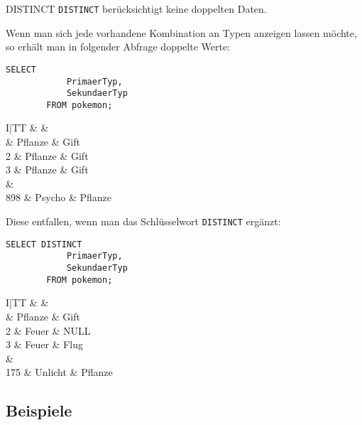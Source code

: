 \begin{sql}{DISTINCT}
    \texttt{DISTINCT} berücksichtigt keine doppelten Daten.

    Wenn man sich jede vorhandene Kombination an Typen anzeigen lassen möchte, so erhält man in folgender Abfrage doppelte Werte:

    \begin{lstlisting}[language=mysql]
        SELECT
            PrimaerTyp,
            SekundaerTyp
        FROM pokemon;
    \end{lstlisting}

    \setcounter{rownum}{0}
    \begin{tabular}{I|TT}
        &  &  \\ & Pflanze & Gift \\
        2 & Pflanze & Gift \\
        3 & Pflanze & Gift \\
         &  \\
        898 & Psycho & Pflanze \\
    \end{tabular}

    Diese entfallen, wenn man das Schlüsselwort \texttt{DISTINCT} ergänzt:

    \begin{lstlisting}[language=mysql]
        SELECT DISTINCT
            PrimaerTyp,
            SekundaerTyp
        FROM pokemon;
    \end{lstlisting}

    \setcounter{rownum}{0}
    \begin{tabular}{I|TT}
        &  &  \\ & Pflanze & Gift \\
        2 & Feuer & NULL \\
        3 & Feuer & Flug \\
         &  \\
        175 & Unlicht & Pflanze \\
    \end{tabular}
\end{sql}

\subsection{Beispiele}

